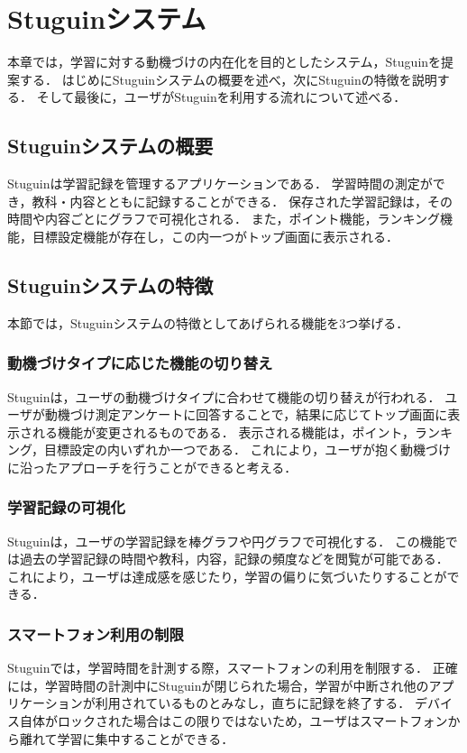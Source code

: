 \chapter{Stuguinシステム}
本章では，学習に対する動機づけの内在化を目的としたシステム，Stuguinを提案する．
はじめにStuguinシステムの概要を述べ，次にStuguinの特徴を説明する．
そして最後に，ユーザがStuguinを利用する流れについて述べる．

\section{Stuguinシステムの概要}
Stuguinは学習記録を管理するアプリケーションである．
学習時間の測定ができ，教科・内容とともに記録することができる．
保存された学習記録は，その時間や内容ごとにグラフで可視化される．
また，ポイント機能，ランキング機能，目標設定機能が存在し，この内一つがトップ画面に表示される．

\section{Stuguinシステムの特徴}
本節では，Stuguinシステムの特徴としてあげられる機能を3つ挙げる．

\subsection{動機づけタイプに応じた機能の切り替え}
Stuguinは，ユーザの動機づけタイプに合わせて機能の切り替えが行われる．
ユーザが動機づけ測定アンケートに回答することで，結果に応じてトップ画面に表示される機能が変更されるものである．
表示される機能は，ポイント，ランキング，目標設定の内いずれか一つである．
これにより，ユーザが抱く動機づけに沿ったアプローチを行うことができると考える．

\subsection{学習記録の可視化}
Stuguinは，ユーザの学習記録を棒グラフや円グラフで可視化する．
この機能では過去の学習記録の時間や教科，内容，記録の頻度などを閲覧が可能である．
これにより，ユーザは達成感を感じたり，学習の偏りに気づいたりすることができる．

\subsection{スマートフォン利用の制限}
Stuguinでは，学習時間を計測する際，スマートフォンの利用を制限する．
正確には，学習時間の計測中にStuguinが閉じられた場合，学習が中断され他のアプリケーションが利用されているものとみなし，直ちに記録を終了する．
デバイス自体がロックされた場合はこの限りではないため，ユーザはスマートフォンから離れて学習に集中することができる．

